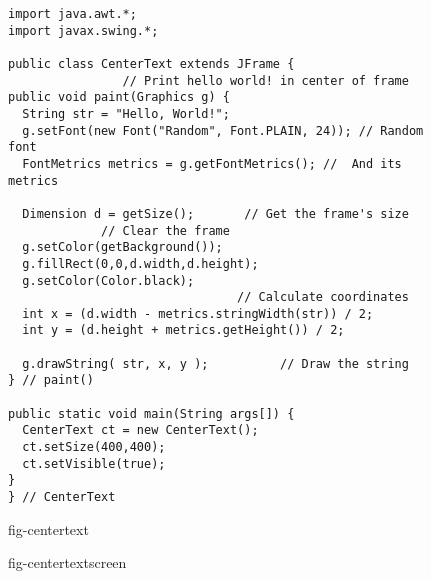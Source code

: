 \begin{figure}[h!]
\jjjprogstart
\begin{jjjlisting}[28pc]
\begin{lstlisting}
import java.awt.*;
import javax.swing.*;

public class CenterText extends JFrame {
                // Print hello world! in center of frame
public void paint(Graphics g) {
  String str = "Hello, World!";
  g.setFont(new Font("Random", Font.PLAIN, 24)); // Random font
  FontMetrics metrics = g.getFontMetrics(); //  And its metrics

  Dimension d = getSize();       // Get the frame's size
             // Clear the frame
  g.setColor(getBackground());
  g.fillRect(0,0,d.width,d.height);
  g.setColor(Color.black);
                                // Calculate coordinates
  int x = (d.width - metrics.stringWidth(str)) / 2; 
  int y = (d.height + metrics.getHeight()) / 2;

  g.drawString( str, x, y );          // Draw the string
} // paint()

public static void main(String args[]) {
  CenterText ct = new CenterText();
  ct.setSize(400,400);
  ct.setVisible(true);
}
} // CenterText
\end{lstlisting}
\end{jjjlisting}
{fig-centertext}
\end{figure}



\begin{figure}[bt]
 {fig-centertextscreen}

\end{figure}

\label{chapter-summary}
\label{technical-terms}

